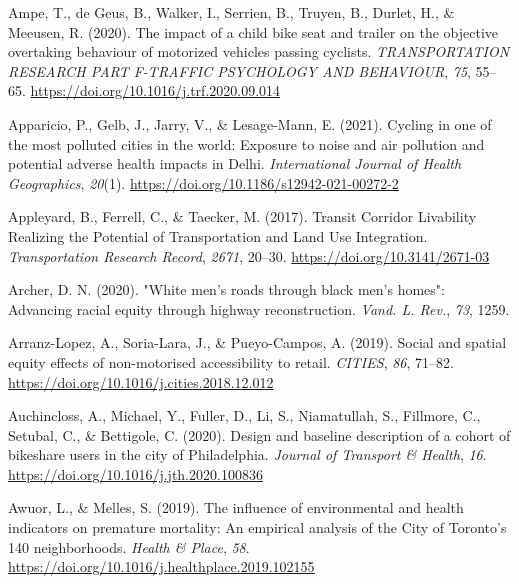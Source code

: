 \documentclass[
  letterpaper,
  DIV=11,
  numbers=noendperiod]{scrartcl}
\newlength{\cslhangindent}
\newenvironment{CSLReferences}[2] %
 {\begin{list}{}{%
  \setlength{\itemindent}{0pt}
  \setlength{\leftmargin}{0pt}
  \setlength{\parsep}{0pt}
  \ifodd #1
   \setlength{\leftmargin}{\cslhangindent}
   \setlength{\itemindent}{-1\cslhangindent}
  \fi
  \setlength{\itemsep}{#2\baselineskip}}}
 {\end{list}}
\begin{document}
\begin{CSLReferences}{1}{0}
Ampe, T., de Geus, B., Walker, I., Serrien, B., Truyen, B., Durlet, H.,
\& Meeusen, R. (2020). The impact of a child bike seat and trailer on
the objective overtaking behaviour of motorized vehicles passing
cyclists. \emph{TRANSPORTATION RESEARCH PART F-TRAFFIC PSYCHOLOGY AND
BEHAVIOUR}, \emph{75}, 55--65.
\url{https://doi.org/10.1016/j.trf.2020.09.014}

Apparicio, P., Gelb, J., Jarry, V., \& Lesage-Mann, E. (2021). Cycling
in one of the most polluted cities in the world: {Exposure} to noise and
air pollution and potential adverse health impacts in {Delhi}.
\emph{International Journal of Health Geographics}, \emph{20}(1).
\url{https://doi.org/10.1186/s12942-021-00272-2}

Appleyard, B., Ferrell, C., \& Taecker, M. (2017). Transit {Corridor
Livability Realizing} the {Potential} of {Transportation} and {Land Use
Integration}. \emph{Transportation Research Record}, \emph{2671},
20--30. \url{https://doi.org/10.3141/2671-03}

Archer, D. N. (2020). "White men's roads through black men's homes":
Advancing racial equity through highway reconstruction. \emph{Vand. L.
Rev.}, \emph{73}, 1259.

Arranz-Lopez, A., Soria-Lara, J., \& Pueyo-Campos, A. (2019). Social and
spatial equity effects of non-motorised accessibility to retail.
\emph{CITIES}, \emph{86}, 71--82.
\url{https://doi.org/10.1016/j.cities.2018.12.012}

Auchincloss, A., Michael, Y., Fuller, D., Li, S., Niamatullah, S.,
Fillmore, C., Setubal, C., \& Bettigole, C. (2020). Design and baseline
description of a cohort of bikeshare users in the city of
{Philadelphia}. \emph{Journal of Transport \& Health}, \emph{16}.
\url{https://doi.org/10.1016/j.jth.2020.100836}

Awuor, L., \& Melles, S. (2019). The influence of environmental and
health indicators on premature mortality: {An} empirical analysis of the
{City} of {Toronto}'s 140 neighborhoods. \emph{Health \& Place},
\emph{58}. \url{https://doi.org/10.1016/j.healthplace.2019.102155}


\end{CSLReferences}
\end{document}
